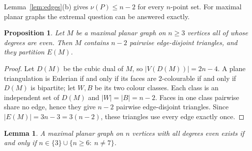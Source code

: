 \documentclass[11pt]{article}
\theoremstyle{plain}
\newtheorem{lemma}[theorem]{Lemma}
\newtheorem{proposition}[theorem]{Proposition}
\theoremstyle{definition}
\theoremstyle{remark}
\begin{document}
Lemma~\ref{lem:edges}(b) gives $\nu(P)\le n-2$ for every $n$-point set.  For maximal planar
graphs the extremal question can be answered exactly.

\begin{proposition}\label{prop:eulerian}
Let $M$ be a maximal planar graph on $n\ge 3$ vertices all of whose degrees are even.  Then
$M$ contains $n-2$ pairwise edge-disjoint triangles, and they partition $E(M)$.
\end{proposition}

\begin{proof}
Let $D(M)$ be the cubic dual of $M$, so $|V(D(M))|=2n-4$.  A plane triangulation is
Eulerian if and only if its faces are $2$-colourable if and only if $D(M)$ is bipartite;
let $W,B$ be its two colour classes.  Each class is an independent set of $D(M)$ and
$|W|=|B|=n-2$.  Faces in one class pairwise share no edge, hence they give $n-2$ pairwise
edge-disjoint triangles.  Since $|E(M)|=3n-3=3(n-2)$, these triangles use every edge
exactly once.
\end{proof}

\begin{lemma}\label{lem:exists}
A maximal planar graph on $n$ vertices with all degrees even exists if and only if
$n\in\{3\}\cup\{n\ge 6:\ n\ne 7\}$.
\end{lemma}
\end{document}
